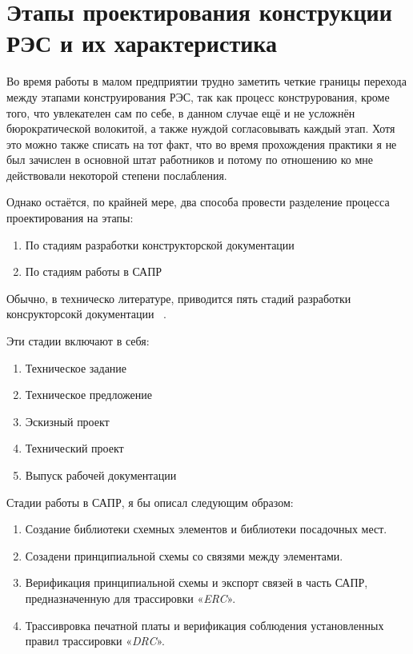 \section{Этапы проектирования конструкции РЭС и их характеристика}

Во время работы в малом предприятии трудно заметить
четкие границы перехода между этапами конструирования РЭС,
так как процесс конструрования, кроме того, что увлекателен сам по себе,
в данном случае ещё и не усложнён бюрократической волокитой,
а также нуждой согласовывать каждый этап.
Хотя это можно также списать на тот факт,
что во время прохождения практики я не был зачислен в основной штат работников и
потому по отношению ко мне действовали некоторой степени послабления.


Однако остаётся, по крайней мере, два способа
провести разделение процесса проектирования
на этапы:

\begin{enumerate}
\item По стадиям разработки конструкторской документации
\item По стадиям работы в САПР
\end{enumerate}

Обычно, в техническо литературе, приводится пять стадий разработки консрукторсокй документации ~\cite{Rotkop1976}.

Эти стадии включают в себя:

\begin{enumerate}
\item Техническое задание         
\item Техническое предложение     
\item Эскизный проект             
\item Технический проект
\item Выпуск рабочей документации
\end{enumerate}


Стадии работы в САПР, я бы описал следующим образом:
\begin{enumerate}
\item Создание библиотеки схемных элементов и библиотеки посадочных мест.
\item Созадени принципиальной схемы со связями между элементами.
\item Верификация принципиальной схемы
  и экспорт связей в часть САПР, предназначенную для трассировки
   «\textit{ERC}».
\item Трассивровка печатной платы и верификация соблюдения
  установленных правил трассировки
  «\textit{DRC}».
\end{enumerate}

